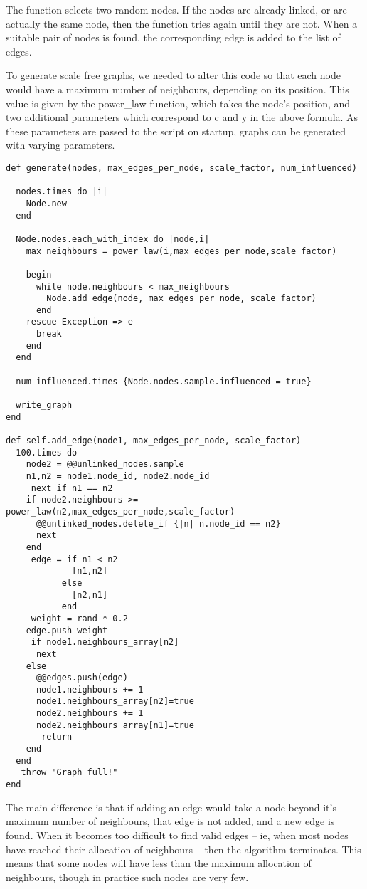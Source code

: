 The function selects two random nodes. If the nodes are already linked, or are actually the same node, then the function tries again until they are not. When a suitable pair of nodes is found, the corresponding edge is added to the list of edges.

To generate scale free graphs, we needed to alter this code so that each node would have a maximum number of neighbours, depending on its position. This value is given by the power\_law function, which takes the node's position, and two additional parameters which correspond to c and y in the above formula. As these parameters are passed to the script on startup, graphs can be generated with varying parameters.


\begin{verbatim}
def generate(nodes, max_edges_per_node, scale_factor, num_influenced)

  nodes.times do |i|
    Node.new
  end

  Node.nodes.each_with_index do |node,i|
    max_neighbours = power_law(i,max_edges_per_node,scale_factor)

    begin
      while node.neighbours < max_neighbours
        Node.add_edge(node, max_edges_per_node, scale_factor)
      end
    rescue Exception => e
      break
    end
  end

  num_influenced.times {Node.nodes.sample.influenced = true}

  write_graph
end

def self.add_edge(node1, max_edges_per_node, scale_factor)
  100.times do
    node2 = @@unlinked_nodes.sample
    n1,n2 = node1.node_id, node2.node_id
     next if n1 == n2
    if node2.neighbours >= power_law(n2,max_edges_per_node,scale_factor)
      @@unlinked_nodes.delete_if {|n| n.node_id == n2}
      next
    end
     edge = if n1 < n2
             [n1,n2]
           else
             [n2,n1]
           end
     weight = rand * 0.2
    edge.push weight
     if node1.neighbours_array[n2]
      next
    else
      @@edges.push(edge)
      node1.neighbours += 1
      node1.neighbours_array[n2]=true
      node2.neighbours += 1
      node2.neighbours_array[n1]=true
       return
    end
  end
   throw "Graph full!"
end

\end{verbatim}

The main difference is that if adding an edge would take a node beyond it's maximum number of neighbours, that edge is not added, and a new edge is found. When it becomes too difficult to find valid edges -- ie, when most nodes have reached their allocation of neighbours -- then the algorithm terminates. This means that some nodes will have less than the maximum allocation of neighbours, though in practice such nodes are very few.


